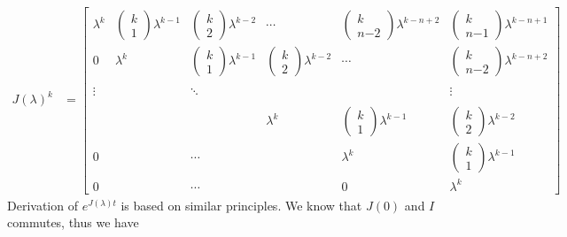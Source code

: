 \documentclass[twoside]{article}
\begin{document}
\begin{align*}
J(\lambda)^k &= \left[  \begin{array}{cccccc} \lambda^k & \begin{pmatrix} k \\ 1 \end{pmatrix} \lambda^{k-1} & \begin{pmatrix} k \\ 2 \end{pmatrix}  \lambda^{k-2} 
& \cdots & \begin{pmatrix} k \\ n\mathrm{-}2 \end{pmatrix} \lambda^{k-n+2} & \begin{pmatrix} k \\ n\mathrm{-}1 \end{pmatrix} \lambda^{k-n+1}
\\ 0 & \lambda^k & \begin{pmatrix} k \\ 1 \end{pmatrix}  \lambda^{k-1} & \begin{pmatrix} k \\ 2 \end{pmatrix} \lambda^{k-2} & \cdots  & \begin{pmatrix} k \\ n\mathrm{-}2 \end{pmatrix} \lambda^{k-n+2}
\\ 
\\  \vdots &  & \ddots &  &  & \vdots \\ 
\\ 
& & & \lambda^k & \begin{pmatrix} k \\ 1 \end{pmatrix}  \lambda^{k-1} & \begin{pmatrix} k \\ 2 \end{pmatrix}  \lambda^{k-2} 
\\ 0 &  & \cdots  &  & \lambda^k & \begin{pmatrix} k \\ 1 \end{pmatrix}  \lambda^{k-1} \\
0 &  & \cdots &  & 0 & \lambda^k \end{array} \right] 
\end{align*}
% 
Derivation of $e^{J(\lambda) t}$ is based on similar principles. We know that $J(0)$ and $I$ commutes, thus we have
\end{document}
